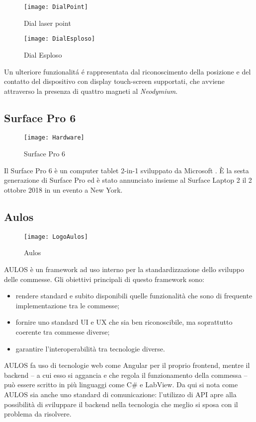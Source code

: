 \begin{figure}[htpb!]
	\begin{minipage}{0.35\textwidth}
		\centering
		\texttt{[image: DialPoint]}
		\caption{Dial laser point}
    \end{minipage}\hfill
    \begin{minipage}{0.65\textwidth}
		\centering
		\texttt{[image: DialEsploso]}
		\caption{Dial Esploso}
    \end{minipage}
\end{figure}

Un ulteriore funzionalitá é rappresentata dal riconoscimento della posizione e del contatto del dispositivo con display touch-screen supportati, che avviene attraverso la presenza di quattro magneti al \emph{Neodymium}. 
\newpage
\subsection{Surface Pro 6}
\begin{figure}[htpb!]
\center
  \texttt{[image: Hardware]}
  \caption{Surface Pro 6}
\end{figure}
Il Surface Pro 6\cite{sur} è un computer tablet 2-in-1 sviluppato da Microsoft . È la sesta generazione di Surface Pro ed è stato annunciato insieme al Surface Laptop 2 il 2 ottobre 2018 in un evento a New York.
\subsection{Aulos}
\begin{figure}[htpb!]
\center
  \texttt{[image: LogoAulos]}
  \caption{Aulos}
\end{figure}
AULOS \cite{aul} è un framework ad uso interno per la standardizzazione dello sviluppo delle commesse.
Gli obiettivi principali di questo framework sono:
\begin{itemize}
\item rendere standard e subito disponibili quelle funzionalità che sono di frequente implementazione tra le commesse;
\item fornire uno standard UI e UX che sia ben riconoscibile, ma soprattutto coerente tra commesse diverse;
\item garantire l’interoperabilità tra tecnologie diverse.
\end{itemize}

AULOS fa uso di tecnologie web come Angular per il proprio frontend, mentre il backend – a cui esso si aggancia e che regola il funzionamento della commessa – può essere scritto in più linguaggi come C\# e LabView.
Da qui si nota come AULOS sia anche uno standard di comunicazione: l’utilizzo di API apre alla possibilità di sviluppare il backend nella tecnologia che meglio si sposa con il problema da risolvere.
\newpage
